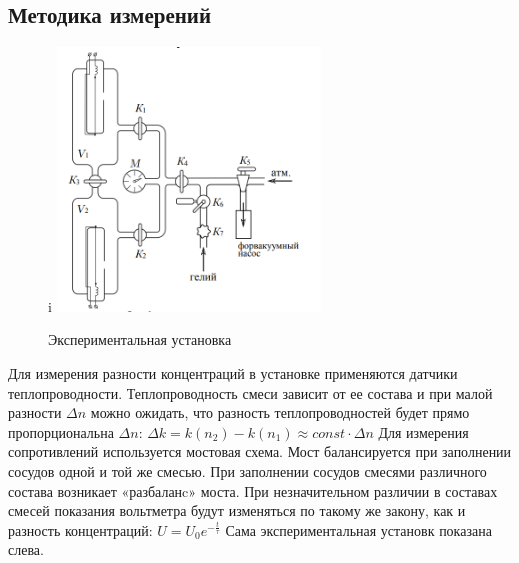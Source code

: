 \subsection*{Методика измерений}
\indent
\begin{figure}{i}
    \centering
    \includegraphics[width=7cm,height=7cm]{mainsetup.png}
    \caption{Экспериментальная установка}
\end{figure}


Для измерения разности концентраций в установке применяются датчики теплопроводности. 
Теплопроводность смеси зависит от ее состава и при малой разности $\Delta n$
можно ожидать, что разность теплопроводностей будет прямо пропорциональна $\Delta n$:
$\Delta k = k(n_2) - k(n_1) \approx const \cdot \Delta n$
Для измерения сопротивлений используется мостовая схема.
Мост балансируется при заполнении сосудов одной и той же
смесью. При заполнении сосудов смесями различного состава возникает
«разбаланc» моста. При незначительном различии в составах смесей показания вольтметра
будут изменяться по такому же закону, как и разность концентраций: 
$U = U_0e^{-\frac{t}{\tau}}$
Сама экспериментальная установк показана слева. 

\newpage


